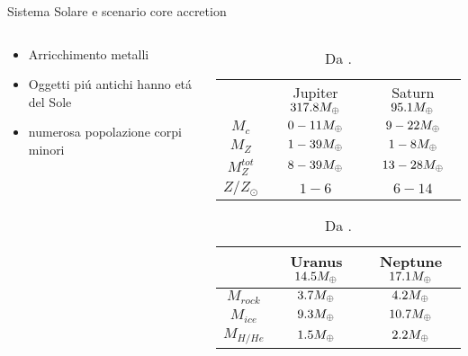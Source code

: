 \begin{frame}{Sistema Solare e scenario core accretion}
\begin{columns}[T]
	\begin{column}{0.45\textwidth}
	\begin{itemize}
			\item Arricchimento metalli
			\item Oggetti pi\'u antichi hanno et\'a del Sole %
			\item numerosa popolazione corpi minori
		\end{itemize}
	\end{column}
	\begin{column}{0.54\textwidth}
		\begin{table}[!ht]
			\begin{flushleft}
\begin{minipage}{.25\linewidth}
	\begin{tabular}{@{}|ccc|@{}}
		\hline
		&\parbox{1.5cm}{Jupiter $317.8M_{\oplus}{}$}&\parbox{1.5cm}{Saturn $95.1M_{\oplus}{}$}\\
		$M_c$&$0-11M_{\oplus}{}$&$9-22M_{\oplus}{}$\\
		\hline
		$M_Z$&$1-39M_{\oplus}{}$&$1-8M_{\oplus}{}$\\
		\hline
		$M_Z^{tot}$&$8-39M_{\oplus}{}$&$13-28M_{\oplus}{}$\\
		\hline
		$Z/Z_{\odot}$&$1-6$&$6-14$\\
		\hline
	\end{tabular}
\end{minipage}%

\vspace{3mm}
			
			\begin{minipage}{.25\linewidth}
				\centering
				\begin{tabular}{@{}|ccc|@{}}
					\hline
					&\parbox{1.5cm}{Uranus $14.5M_{\oplus}{}$}&\parbox{1.5cm}{Neptune $17.1M_{\oplus}{}$}\\
					\hline
					$M_{rock}$&$3.7M_{\oplus}{}$&$4.2M_{\oplus}{}$\\
					\hline
					$M_{ice}$&$9.3M_{\oplus}{}$&$10.7M_{\oplus}{}$\\
					\hline
					$M_{H/He}$&$1.5M_{\oplus}{}$&$2.2M_{\oplus}{}$\\
					\hline
				\end{tabular}
			\end{minipage}
					\end{flushleft}
			\caption{Da \cite{baraffe2009physical}.}\label{tab:JSUNcomp}
		\end{table}
	\end{column}
\end{columns}
\end{frame}

